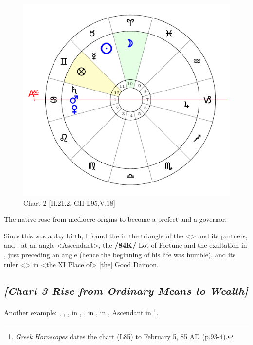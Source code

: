 \clearpage
\begin{figure}
\centering

\includegraphics[width=.68\textwidth]{charts/2_21_2}
\caption{Chart 2 [II.21.2, GH L95,V,18]}
\label{fig:chart02}
\end{figure}

The native rose from mediocre origins to become a prefect and a governor. 

Since this was a day birth, I found the \Sun\xspace in the triangle of the \Moon\xspace <\Taurus\xspace \Virgo\xspace \Capricorn> and its partners, \Venus\xspace and \Mars, at an angle <Ascendant>, the \textbf{/84K/} Lot of Fortune and the exaltation in \Gemini, just preceding an angle (hence the beginning of his life was humble), and its ruler <\Mercury> in <the XI Place of> [the] Good Daimon.
\newpage

\subsection*{\textit{[Chart 3 Rise from Ordinary Means to Wealth]}}

Another example: \Sun, \Mars, \Venus, \Mercury\xspace in \Aquarius, \Moon, \Jupiter\xspace in \Scorpio, \Saturn\xspace in \Aries, Ascendant in \Leo
\footnote{\textit{Greek Horoscopes} dates the chart (L85) to February 5, 85 AD (p.93-4).}.

